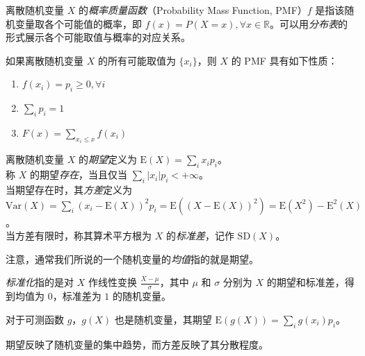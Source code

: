 \documentclass[../main.tex]{subfiles}
\begin{document}
\begin{definition}\label{def:2.2.1}
    离散随机变量 $X$ 的\emph{概率质量函数}（Probability Mass Function, PMF）$f$ 是指该随机变量取各个可能值的概率，即 $f(x)=P(X=x),\forall x\in\mathbb{R}$。可以用\emph{分布表}的形式展示各个可能取值与概率的对应关系。
\end{definition}

\begin{proposition}
    如果离散随机变量 $X$ 的所有可能取值为 $\{x_i\}$，则 $X$ 的 PMF 具有如下性质：
    \begin{enumerate}
        \item $f(x_i)=p_i\geq 0,\forall i$
        \item $\sum_i p_i=1$
        \item $F(x)=\sum_{x_i\leq x}f(x_i)$
    \end{enumerate}
\end{proposition}

\begin{definition}\label{def:2.2.2}
    \mbox{}
    离散随机变量 $X$ 的\emph{期望}定义为 $\mathrm{E}(X)=\sum_ix_ip_i$。\\
    称 $X$ 的期望\emph{存在}，当且仅当 $\sum_i|x_i|p_i<+\infty$。\\
    当期望存在时，其\emph{方差}定义为 $\mathrm{Var}(X)=\sum_i(x_i-\mathrm{E}(X))^2p_i=\mathrm{E}((X-\mathrm{E}(X))^2)=\mathrm{E}(X^2)-\mathrm{E}^2(X)$。\\
    当方差有限时，称其算术平方根为 $X$ 的\emph{标准差}，记作 $\mathrm{SD}(X)$。
\end{definition}

注意，通常我们所说的一个随机变量的\emph{均值}指的就是期望。

\emph{标准化}指的是对 $X$ 作线性变换 $\frac{X-\mu}{\sigma}$，其中 $\mu$ 和 $\sigma$ 分别为 $X$ 的期望和标准差，得到均值为 $0$，标准差为 $1$ 的随机变量。

对于可测函数 $g$，$g(X)$ 也是随机变量，其期望 $\mathrm{E}(g(X))=\sum_ig(x_i)p_i$。

期望反映了随机变量的集中趋势，而方差反映了其分散程度。
\end{document}
